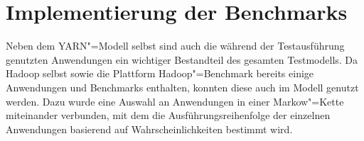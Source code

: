 \chapter{Implementierung der Benchmarks}\label{chap:benchmarks}

Neben dem YARN"=Modell selbst sind auch die während der Testausführung genutzten Anwendungen ein wichtiger Bestandteil des gesamten Testmodells. Da Hadoop selbst sowie die Plattform Hadoop"=Benchmark bereits einige Anwendungen und Benchmarks enthalten, konnten diese auch im Modell genutzt werden. Dazu wurde eine Auswahl an Anwendungen in einer Markow"=Kette miteinander verbunden, mit dem die Ausführungsreihenfolge der einzelnen Anwendungen basierend auf Wahrscheinlichkeiten bestimmt wird.





